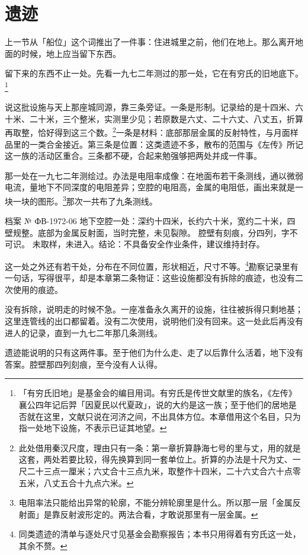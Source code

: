 \section{遗迹}

上一节从「船位」这个词推出了一件事：住进城里之前，他们在地上。那么离开地面的时候，地上应当留下东西。

留下来的东西不止一处。先看一九七二年测过的那一处，它在有穷氏的旧地底下。\footnote{「有穷氏旧地」是基金会的编目用词。有穷氏是传世文献里的族名，《左传》襄公四年记后羿「因夏民以代夏政」，说的大约是这一族；至于他们的居地是否就在这里，文献只说在河济之间，不出具体方位。本章借用这个名目，只为指一处地下设施，不表示已证其地望。}

说这批设施与天上那座城同源，靠三条旁证。一条是形制。记录给的是十四米、六十米、二十米，三个整米，实测里少见；若原数是六丈、二十六丈、八丈五，折算再取整，恰好得到这三个数。\footnote{此处借用秦汉尺度，理由只有一条：第一章折算静海七号的里与丈，用的就是这套，两处若要比较，得先换算到同一套单位上。折算的办法是十尺为丈、一尺二十三点一厘米；六丈合十三点九米，取整作十四米，二十六丈合六十点零五米，八丈五合十九点六米。}一条是材料：底部那层金属的反射特性，与月面样品里的一类合金接近。第三条是位置：这类遗迹不多，散布的范围与《左传》所记这一族的活动区重合。三条都不硬，合起来勉强够把两处并成一件事。

那一处在一九七二年测绘过。办法是电阻率成像：在地面布若干条测线，通以微弱电流，量地下不同深度的电阻差异；空腔的电阻高，金属的电阻低，画出来就是一块一块的图形。\footnote{电阻率法只能给出异常的轮廓，不能分辨轮廓里是什么。所以那一层「金属反射面」是靠反射波形定的。两法合看，才敢说那里有一层金属。}那次一共布了九条测线。

\begin{archive}[内部参考]{档案 № ФВ-1972-06}
地下空腔一处：深约十四米，长约六十米，宽约二十米，四壁规整。底部为金属反射面，当时完整，未见裂隙。
腔壁有刻痕，分四列，字不可识。
未取样，未进入。结论：不具备安全作业条件，建议维持封存。
\end{archive}

这一处之外还有若干处，分布在不同位置，形状相近，尺寸不等。\footnote{同类遗迹的清单与逐处尺寸见基金会勘察报告；本书只用得着有穷氏这一处，其余不赘。}勘察记录里有一句话，写得很平，却是本章第二条物证：这些设施都没有拆除的痕迹，也没有二次使用的痕迹。

没有拆除，说明走的时候不急。一座准备永久离开的设施，往往被拆得只剩地基；这里连管线的出口都留着。没有二次使用，说明他们没有回来。这一处此后再没有进人的记录，直到一九七二年那几条测线。

遗迹能说明的只有这两件事。至于他们为什么走、走了以后靠什么活着，地下没有答案。腔壁那四列刻痕，至今没有人认得。

